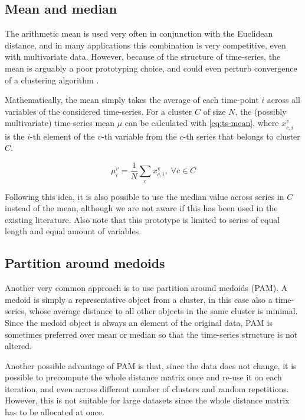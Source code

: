 \subsection{Mean and median}
\label{sec:mean-median}

The arithmetic mean is used very often in conjunction with the Euclidean distance,
and in many applications this combination is very competitive,
even with multivariate data.
However, because of the structure of time-series,
the mean is arguably a poor prototyping choice,
and could even perturb convergence of a clustering algorithm \citep{petitjean2011}.

Mathematically, the mean simply takes the average of each time-point $i$ across all variables of the considered time-series.
For a cluster $C$ of size $N$,
the (possibly multivariate) time-series mean $\mu$ can be calculated with \cref{eq:ts-mean},
where $x^v_{c,i}$ is the $i$-th element of the $v$-th variable from the $c$-th series that belongs to cluster $C$.

\begin{equation}
\label{eq:ts-mean}
\mu^v_i = \frac{1}{N} \sum_c x^v_{c,i}, \; \forall c \in C
\end{equation}

Following this idea, it is also possible to use the median value across series in $C$ instead of the mean,
although we are not aware if this has been used in the existing literature.
Also note that this prototype is limited to series of equal length and equal amount of variables.

\subsection{Partition around medoids}
\label{sec:pam}

Another very common approach is to use partition around medoids (PAM).
A medoid is simply a representative object from a cluster,
in this case also a time-series,
whose average distance to all other objects in the same cluster is minimal.
Since the medoid object is always an element of the original data,
PAM is sometimes preferred over mean or median so that the time-series structure is not altered.

Another possible advantage of PAM is that,
since the data does not change,
it is possible to precompute the whole distance matrix once and re-use it on each iteration,
and even across different number of clusters and random repetitions.
However, this is not suitable for large datasets since the whole distance matrix has to be allocated at once.

